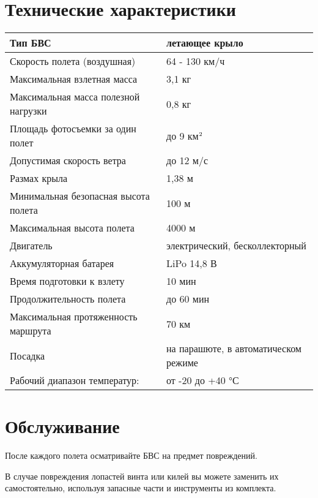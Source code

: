 \documentclass[a4paper,10pt,russian,openany]{sphinxmanual}
\begin{document}
\section{Технические характеристики}
\label{\detokenize{reference:id3}}

\begin{savenotes}\sphinxattablestart
\centering
\begin{tabulary}{\linewidth}[t]{|T|T|}
\hline

Тип БВС
&
летающее крыло
\\
\hline
Скорость полета (воздушная)
&
64 - 130 км/ч
\\
\hline
Максимальная взлетная масса
&
3,1 кг
\\
\hline
Максимальная масса полезной нагрузки
&
0,8 кг
\\
\hline
Площадь фотосъемки за один полет
&
до 9 км\(\sp{\text{2}}\)
\\
\hline
Допустимая скорость ветра
&
до 12 м/с
\\
\hline
Размах крыла
&
1,38 м
\\
\hline
Минимальная безопасная высота полета
&
100 м
\\
\hline
Максимальная высота полета
&
4000 м
\\
\hline
Двигатель
&
электрический, бесколлекторный
\\
\hline
Аккумуляторная батарея
&
LiPo 14,8 В
\\
\hline
Время подготовки к взлету
&
10 мин
\\
\hline
Продолжительность полета
&
до 60 мин
\\
\hline
Максимальная протяженность маршрута
&
70 км
\\
\hline
Посадка
&
на парашюте, в автоматическом режиме
\\
\hline
Рабочий диапазон температур:
&
от -20 до +40 °С
\\
\hline
\end{tabulary}
\par
\sphinxattableend\end{savenotes}


\section{Обслуживание}
\label{\detokenize{reference:id4}}
После каждого полета осматривайте БВС на предмет повреждений.

В случае повреждения лопастей винта или килей вы можете заменить их самостоятельно, используя запасные части и инструменты из комплекта.
\end{document}
